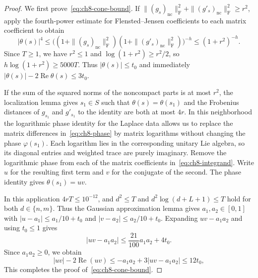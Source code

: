\begin{proof}
We first prove~\eqref{eq:ch8-cone-bound}. If $\|(g_s)_{\mathrm{nc}}\|_{\mathrm F}^2+\|(g'_s)_{\mathrm{nc}}\|_{\mathrm F}^2\ge r^2$, apply the fourth-power estimate for Flensted--Jensen coefficients to each matrix coefficient to obtain
\[
 |\theta(s)|^4
 \le \bigl((1+\|(g_s)_{\mathrm{nc}}\|_{\mathrm F}^2)
           (1+\|(g'_s)_{\mathrm{nc}}\|_{\mathrm F}^2)\bigr)^{-h}
 \le (1+r^2)^{-h}.
\]
Since $T\ge1$, we have $r^2\le1$ and $\log(1+r^2)\ge r^2/2$, so $h\log(1+r^2)\ge 5000T$. Thus $|\theta(s)|\le t_0$ and immediately $|\theta(s)|-2\operatorname{Re}\theta(s)\le3t_0$.

If the sum of the squared norms of the noncompact parts is at most $r^2$, the localization lemma gives $s_1\in S$ such that $\theta(s)=\theta(s_1)$ and the Frobenius distances of $g_{s_1}$ and $g'_{s_1}$ to the identity are both at most $4r$. In this neighborhood the logarithmic phase identity for the Laplace data allows us to replace the matrix differences in~\eqref{eq:ch8-phase} by matrix logarithms without changing the phase $\varphi(s_1)$. Each logarithm lies in the corresponding unitary Lie algebra, so its diagonal entries and weighted trace are purely imaginary. Remove the logarithmic phase from each of the matrix coefficients in~\eqref{eq:ch8-integrand}. Write $u$ for the resulting first term and $v$ for the conjugate of the second. The phase identity gives $\theta(s_1)=uv$.

In this application $4rT\le10^{-12}$, and $d^2\le T$ and $d^2\log(d+L+1)\le T$ hold for both $d\in\{n,m\}$. Thus the Gaussian approximation lemma gives $a_1,a_2\in[0,1]$ with $|u-a_1|\le a_1/10+t_0$ and $|v-a_2|\le a_2/10+t_0$. Expanding $uv-a_1a_2$ and using $t_0\le1$ gives
\[
 |uv-a_1a_2|\le \frac{21}{100}a_1a_2+4t_0.
\]
Since $a_1a_2\ge0$, we obtain
\[
 |uv|-2\operatorname{Re}(uv)
 \le -a_1a_2+3|uv-a_1a_2|\le12t_0,
\]
This completes the proof of~\eqref{eq:ch8-cone-bound}.


\end{proof}
